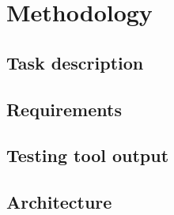\chapter{Methodology}\label{cha:methodology}

\section{Task description}

\section{Requirements}

\section{Testing tool output}

\section{Architecture}